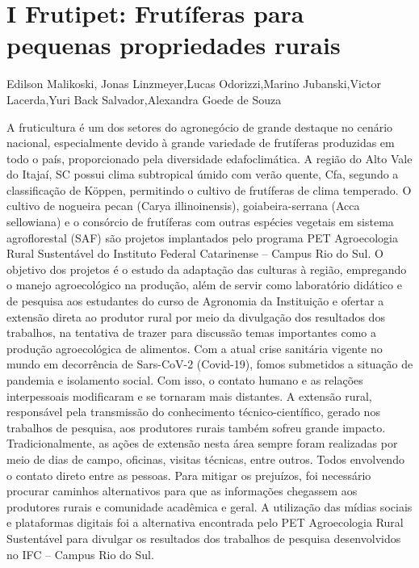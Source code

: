 

\section{I Frutipet: Frutíferas para pequenas propriedades rurais}

Edilson Malikoski, Jonas Linzmeyer,Lucas Odorizzi,Marino Jubanski,Victor Lacerda,Yuri Back Salvador,Alexandra Goede de Souza

A fruticultura é um dos setores do agronegócio de grande destaque no cenário nacional, 
especialmente devido à grande variedade de frutíferas produzidas em todo o país, proporcionado 
pela diversidade edafoclimática. A região do Alto Vale do Itajaí, SC possui clima subtropical 
úmido com verão quente, Cfa, segundo a classificação de Köppen, permitindo o cultivo de 
frutíferas de clima temperado. O cultivo de nogueira pecan (Carya illinoinensis), goiabeira-serrana 
(Acca sellowiana) e o consórcio de frutíferas com outras espécies vegetais em sistema agroflorestal 
(SAF) são projetos implantados pelo programa PET Agroecologia Rural Sustentável do Instituto 
Federal Catarinense – Campus Rio do Sul. O objetivo dos projetos é o estudo da adaptação das 
culturas à região, empregando o manejo agroecológico na produção, além de servir como 
laboratório didático e de pesquisa aos estudantes do curso de Agronomia da Instituição e ofertar a 
extensão direta ao produtor rural por meio da divulgação dos resultados dos trabalhos, na tentativa 
de trazer para discussão temas importantes como a produção agroecológica de alimentos.
Com a atual crise sanitária vigente no mundo em decorrência de Sars-CoV-2 (Covid-19), 
fomos submetidos a situação de pandemia e isolamento social. Com isso, o contato humano e as 
relações interpessoais modificaram e se tornaram mais distantes. A extensão rural, responsável 
pela transmissão do conhecimento técnico-científico, gerado nos trabalhos de pesquisa, aos 
produtores rurais também sofreu grande impacto. Tradicionalmente, as ações de extensão nesta 
área sempre foram realizadas por meio de dias de campo, oficinas, visitas técnicas, entre outros. 
Todos envolvendo o contato direto entre as pessoas. Para mitigar os prejuízos, foi necessário 
procurar caminhos alternativos para que as informações chegassem aos produtores rurais e 
comunidade acadêmica e geral. A utilização das mídias sociais e plataformas digitais foi a 
alternativa encontrada pelo PET Agroecologia Rural Sustentável para divulgar os resultados dos 
trabalhos de pesquisa desenvolvidos no IFC – Campus Rio do Sul. 
